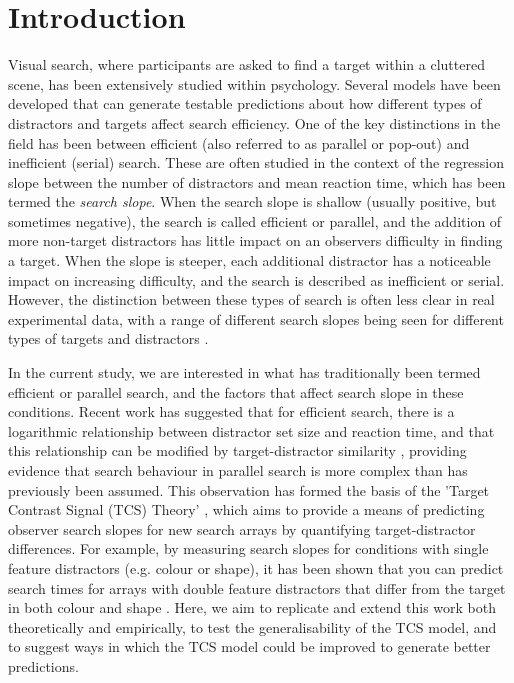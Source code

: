 \documentclass[smallextended, natbib]{svjour3}       %
\begin{document}
\section{Introduction}
\label{intro}

Visual search, where participants are asked to find a target within a cluttered scene, has been extensively studied within psychology. Several models have been developed that can generate testable predictions about how different types of distractors and targets affect search efficiency. One of the key distinctions in the field has been between efficient (also referred to as parallel or pop-out) and inefficient (serial) search. These are often studied in the context of the regression slope between the number of distractors and mean reaction time, which has been termed the \textit{search slope}. When the search slope is shallow (usually positive, but sometimes negative), the search is called efficient or parallel, and the addition of more non-target distractors has little impact on an observers difficulty in finding a target. When the slope is steeper, each additional distractor has a noticeable impact on increasing difficulty, and the search is described as inefficient or serial. However, the distinction between these types of search is often less clear in real experimental data, with a range of different search slopes being seen for different types of targets and distractors \citep{cave1990modeling}.

In the current study, we are interested in what has traditionally been termed efficient or parallel search, and the factors that affect search slope in these conditions. Recent work has suggested that for efficient search, there is a logarithmic relationship between distractor set size and reaction time, and that this relationship can be modified by target-distractor similarity \citep{buetti2016towards}, providing evidence that search behaviour in parallel search is more complex than has previously been assumed. This observation has formed the basis of the 'Target Contrast Signal (TCS) Theory' \citep{lleras2020target}, which aims to provide a means of predicting observer search slopes for new search arrays by quantifying target-distractor differences. For example, by measuring search slopes for conditions with single feature distractors (e.g. colour or shape), it has been shown that you can predict search times for arrays with double feature distractors that differ from the target in both colour and shape \citep{buetti2019predicting}. Here, we aim to replicate and extend this work both theoretically and empirically, to test the generalisability of the TCS model, and to suggest ways in which the TCS model could be improved to generate better predictions.
\end{document}
